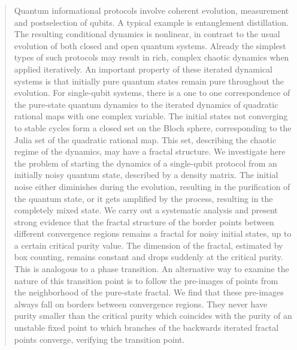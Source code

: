 \documentclass[%
 aip,
 amsmath,amssymb,
 reprint,%
]{revtex4-1}
\begin{document}
\maketitle

\begin{quotation}
Quantum informational protocols involve coherent evolution, measurement and postselection of qubits. A typical example is entanglement distillation. The resulting conditional dynamics is nonlinear, in contrast to the usual evolution of both closed and open quantum systems. Already the simplest types of such protocols may result in rich, complex chaotic dynamics when applied iteratively. An important property of these iterated dynamical systems is that initially pure quantum states remain pure throughout the evolution. For single-qubit systems, there is a one to one correspondence of the pure-state quantum dynamics to the iterated dynamics of quadratic rational maps with one complex variable. The initial states not converging to stable cycles form a closed set on the Bloch sphere, corresponding to the Julia set of the quadratic rational map. This set, describing the chaotic regime of the dynamics, may have a fractal structure. We investigate here the problem of starting the dynamics of a single-qubit protocol from an initially noisy quantum state, described by a density matrix. The initial noise either diminishes during the evolution, resulting in the purification of the quantum state, or it gets amplified by the process, resulting in the completely mixed state. %
We carry out a systematic analysis and present strong evidence that the fractal structure of the border points between different convergence regions remains a fractal for noisy initial states, up to a certain critical purity value. The dimension of the fractal, estimated by box counting, remains constant and drops suddenly at the critical purity. This is analogous to a phase transition. An alternative way to examine the nature of this transition point is to follow the pre-images of points from the neighborhood of the pure-state fractal. %
We find that these pre-images always fall on borders between convergence regions. They never have purity smaller than the critical purity which coincides with the purity of an unstable fixed point 
to which branches of the backwards iterated fractal points %
converge, verifying the transition point. 
\end{quotation}
\end{document}
